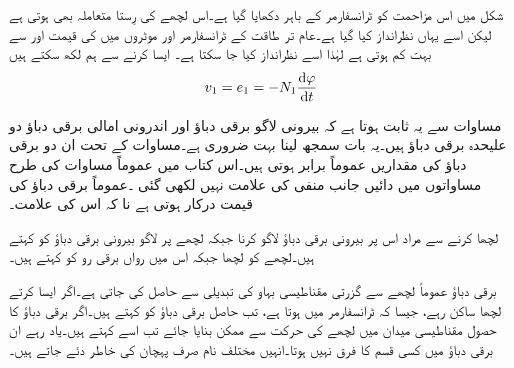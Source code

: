 شکل میں اس مزاحمت کو ٹرانسفارمر کے باہر دکھایا گیا ہے۔اس لچھے کی رِستا متعاملہ بھی ہوتی ہے لیکن اسے یہاں نظرانداز کیا گیا ہے۔عام تر طاقت کے ٹرانسفارمر اور موٹروں  میں  کی قیمت  اور  سے بہت کم ہوتی ہے لہٰذا اسے نظرانداز کیا جا سکتا ہے۔ ایسا کرنے سے ہم لکھ سکتے ہیں 
\begin{align}\label{مساوات_ٹرانسفارمر_بیرونی_اندرونی_دباؤ_تقریبا_برابر}
v_1 = e_1=-N_1 \frac{\dif \varphi}{\dif t}
\end{align}

مساوات  سے یہ ثابت ہوتا ہے کہ بیرونی لاگو برقی دباؤ  اور اندرونی امالی برقی دباؤ  دو علیحدہ برقی دباؤ ہیں۔یہ بات سمجھ لینا بہت ضروری ہے۔مساوات  کے تحت ان دو برقی دباؤ کی مقداریں عموماً برابر ہوتی ہیں۔اس کتاب میں عموماً مساوات   کی طرح مساواتوں میں دائیں جانب منفی کی علامت نہیں لکھی گئی ۔عموماً برقی دباؤ کی قیمت درکار ہوتی ہے نا کہ اس کی علامت۔

لچھا  کرنے سے مراد اس پر بیرونی برقی دباؤ لاگو کرنا  جبکہ لچھے پر لاگو بیرونی برقی دباؤ کو   کہتے ہیں۔لچھے  کو  لچھا جبکہ اس میں رواں برقی رو کو  کہتے ہیں۔

برقی دباؤ عموماً لچھے سے گزرتی مقناطیسی بہاو کی تبدیلی سے حاصل کی جاتی ہے۔اگر ایسا کرتے لچھا ساکن رہے، جیسا کہ ٹرانسفارمر میں ہوتا ہے، تب حاصل برقی دباؤ کو   کہتے ہیں۔اگر برقی دباؤ کا حصول مقناطیسی میدان میں لچھے کی حرکت سے ممکن بنایا جائے تب اسے    کہتے ہیں۔یاد رہے ان برقی دباؤ میں کسی قسم کا فرق نہیں ہوتا۔انہیں مختلف نام صرف پہچان کی خاطر دئے جاتے ہیں۔

